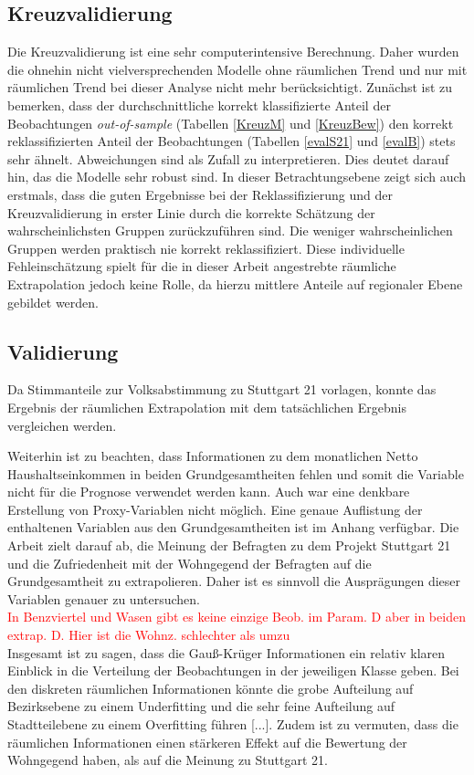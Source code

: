 \documentclass{Vorlage}
\begin{document}
\subsection{Kreuzvalidierung}
Die Kreuzvalidierung ist eine sehr computerintensive Berechnung. Daher wurden die ohnehin nicht vielversprechenden Modelle ohne räumlichen Trend und nur mit räumlichen Trend bei dieser Analyse nicht mehr berücksichtigt. Zunächst ist zu bemerken, dass der durchschnittliche korrekt klassifizierte Anteil der Beobachtungen \textit{out-of-sample} (Tabellen \ref{KreuzM} und \ref{KreuzBew}) den korrekt reklassifizierten Anteil der Beobachtungen (Tabellen \ref{evalS21} und \ref{evalB}) stets sehr ähnelt. Abweichungen sind als Zufall zu interpretieren. Dies deutet darauf hin, das die Modelle sehr robust sind.
In dieser Betrachtungsebene zeigt sich auch erstmals, dass die guten Ergebnisse bei der Reklassifizierung und der Kreuzvalidierung in erster Linie durch die korrekte Schätzung der wahrscheinlichsten Gruppen zurückzuführen sind. Die weniger wahrscheinlichen Gruppen werden praktisch nie korrekt reklassifiziert. Diese individuelle Fehleinschätzung spielt für die in dieser Arbeit angestrebte räumliche Extrapolation jedoch keine Rolle, da hierzu mittlere Anteile auf regionaler Ebene gebildet werden.


\subsection{Validierung}
Da Stimmanteile zur Volksabstimmung zu Stuttgart 21 vorlagen, konnte das Ergebnis der räumlichen Extrapolation mit dem tatsächlichen Ergebnis vergleichen werden.


Weiterhin ist zu beachten, dass Informationen zu dem monatlichen Netto Haushaltseinkommen in beiden Grundgesamtheiten fehlen und somit die Variable nicht für die Prognose verwendet werden kann. Auch war eine denkbare Erstellung von Proxy-Variablen nicht möglich. Eine genaue Auflistung der enthaltenen Variablen aus den Grundgesamtheiten ist im Anhang verfügbar. Die Arbeit zielt darauf ab, die Meinung der Befragten zu dem Projekt Stuttgart 21 und die Zufriedenheit mit der Wohngegend der Befragten auf die Grundgesamtheit zu extrapolieren. Daher ist es sinnvoll die Ausprägungen dieser Variablen genauer zu untersuchen.\\

\textcolor{red}{In Benzviertel und Wasen gibt es keine einzige Beob. im Param. D aber in beiden extrap. D. Hier ist die Wohnz. schlechter als umzu}\\
Insgesamt ist zu sagen, dass die Gauß-Krüger Informationen ein relativ klaren Einblick in die Verteilung der Beobachtungen in der jeweiligen Klasse geben. Bei den diskreten räumlichen Informationen könnte die grobe Aufteilung auf Bezirksebene zu einem Underfitting und die sehr feine Aufteilung auf Stadtteilebene zu einem Overfitting führen [...]. Zudem ist zu vermuten, dass die räumlichen Informationen einen stärkeren Effekt auf die Bewertung der Wohngegend haben, als auf die Meinung zu Stuttgart 21.
\end{document}
